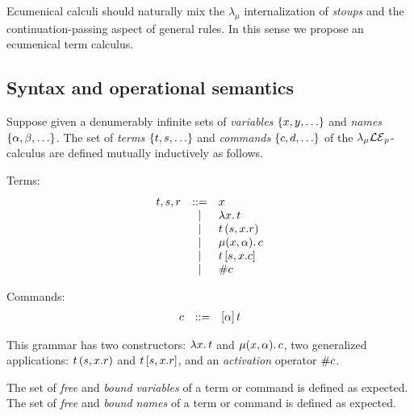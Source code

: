 
 Ecumenical calculi should naturally mix the $\lambda_\mu$ internalization of {\em stoups} 
 and the continuation-passing aspect of general rules. 
 In this sense we propose an ecumenical term calculus. 

\subsection{Syntax and operational semantics}
\begin{definition}[Syntax]
Suppose given a denumerably infinite sets 
of {\em variables} $\{x,y,\hdots\}$ 
and {\em names} $\{\alpha,\beta,\hdots\}$.
The set of {\em terms} $\{t,s,\hdots\}$
and {\em commands} $\{c,d,\hdots\}$
of the $\lambda_{\mu}\mathcal{LE}_p$-calculus are defined mutually inductively as follows.

\begin{marianaenv}
Terms:
\[
\begin{array}{lcl}
  t,s,r 
         & ::=  & x                               \\
         & \mid & \lambda x.\,t                   \\
         & \mid & t \, (s,x.r) \\ 
         & \mid & \mu(x,\alpha).\,c           \\
         & \mid & t \, [s,x.c]     \\
         & \mid & \# c
\end{array}
\]
\end{marianaenv}

Commands:
\[
\begin{array}{lcl}
  c & ::=  & [\alpha]\,t
\end{array}
\]



\begin{marianaenv}
This grammar has two constructors: $\lambda x.\,t$ and $\mu(x,\alpha).\,c$,
two generalized applications: $t \, (s,x.r)$ and $t \, [s,x.r]$,
and an {\em activation} operator $\# c$.

The set of {\em free} and {\em bound variables} of a term or command is defined as expected.
The set of {\em free} and {\em bound names} of a term or command is defined as expected.
\end{marianaenv}
\end{definition}


